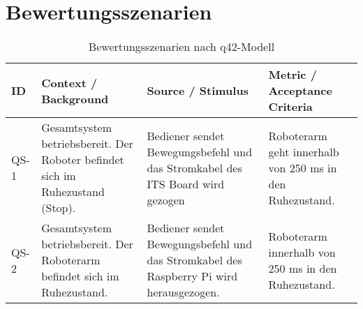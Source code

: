 

\section{Bewertungsszenarien}
\begin{table}[h!]
\centering
\begin{tabular}{p{2cm}|p{5cm}|p{4cm}|p{5cm}}
\hline
\textbf{ID} & \textbf{Context / Background} & \textbf{Source / Stimulus} & \textbf{Metric / Acceptance Criteria} \\
\hline
QS-1 &
Gesamtsystem betriebsbereit. Der Roboter befindet sich im Ruhezustand (Stop). &
Bediener sendet Bewegungsbefehl und das Stromkabel des ITS Board wird gezogen & 
Roboterarm geht innerhalb von 250 ms in den Ruhezustand. \\

\hline
QS-2 &
Gesamtsystem betriebsbereit. Der Roboterarm befindet sich im Ruhezustand. &
Bediener sendet Bewegungsbefehl und das Stromkabel des Raspberry Pi wird herausgezogen. &
Roboterarm innerhalb von 250 ms in den Ruhezustand. 

\end{tabular}
\caption{Bewertungsszenarien nach q42-Modell}
\label{tab:bewertungsszenarien}
\end{table}


